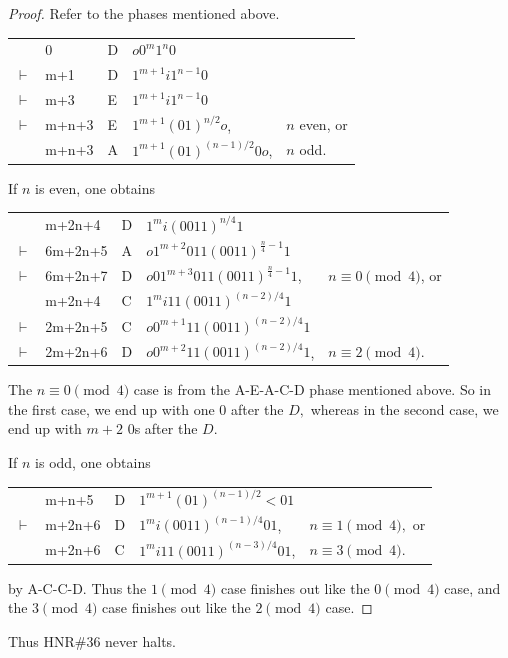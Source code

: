 \documentclass[12pt]{article}
\begin{document}
\begin{proof}
Refer to the phases mentioned above.
\begin{table}[H]
\begin{tabular}{rllll}
        &0    &D&$o0^{m}1^{n}0$\\
$\vdash$&m+1  &D&$1^{m+1}i1^{n-1}0$\\
$\vdash$&m+3  &E&$1^{m+1}i1^{n-1}0$\\
$\vdash$&m+n+3&E&$1^{m+1}(01)^{n/2}o$,     &$n$ even, or\\
        &m+n+3&A&$1^{m+1}(01)^{(n-1)/2}0o$,&$n$ odd.
\end{tabular}
\end{table}

If $n$ is even, one obtains
\begin{table}[H]
\begin{tabular}{rllll}
        &m+2n+4 &D&$1^{m}i(0011)^{n/4}1$\\
$\vdash$&6m+2n+5&A&$o1^{m+2}011(0011)^{\frac{n}{4}-1}1$\\
$\vdash$&6m+2n+7&D&$o01^{m+3}011(0011)^{\frac{n}{4}-1}1$, &$n\equiv0\pmod4$, or\\
        &m+2n+4 &C&$1^{m}i11(0011)^{(n-2)/4}1$\\
$\vdash$&2m+2n+5&C&$o0^{m+1}11(0011)^{(n-2)/4}1$\\
$\vdash$&2m+2n+6&D&$o0^{m+2}11(0011)^{(n-2)/4}1$,&$n\equiv2\pmod4$.
\end{tabular}
\end{table}
The $n\equiv0\pmod4$ case is from the A-E-A-C-D phase mentioned above.
So in the first case, we end up with one 0 after the $D,$
whereas in the second case, we end up with $m+2$ 0s after the $D.$

If $n$ is odd, one obtains
\begin{table}[H]
\begin{tabular}{rllll}
        &m+n+5 &D&$1^{m+1}(01)^{(n-1)/2}<01$\\
$\vdash$&m+2n+6&D&$1^{m}i(0011)^{(n-1)/4}01$,&$n\equiv1\pmod4,$ or\\
        &m+2n+6&C&$1^{m}i11(0011)^{(n-3)/4}01$,&$n\equiv3\pmod4.$
\end{tabular}
\end{table}
by A-C-C-D. Thus the $1\pmod4$ case finishes out like the $0\pmod4$ case,
and the $3\pmod4$ case finishes out like the $2\pmod4$ case.
\end{proof}
Thus HNR\#36 never halts.

\clearpage
{}
{}
\end{document}
